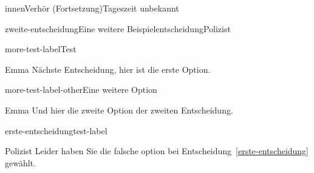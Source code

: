 \documentclass[12pt]{article}
\begin{document}
\begin{scene}{innen}{Verhör (Fortsetzung)}{Tageszeit unbekannt}
        \begin{decision}{zweite-entscheidung}{Eine weitere Beispielentscheidung}{Polizist}
            \begin{option}{more-test-label}{Test}
                \begin{dialog}{Emma}
                    Nächste Entscheidung, hier ist die erste Option.
                \end{dialog}
            \end{option}
            \begin{option}{more-test-label-other}{Eine weitere Option}
                \begin{dialog}{Emma}
                    Und hier die zweite Option der zweiten Entscheidung.
                \end{dialog}
            \end{option}
        \end{decision}

        \begin{conditional}{erste-entscheidung}{test-label}
            \begin{dialog}{Polizist}
                Leider haben Sie die falsche option bei Entscheidung~\ref{erste-entscheidung} gewählt.
            \end{dialog}
        \end{conditional}

    \end{scene}
\end{document}
